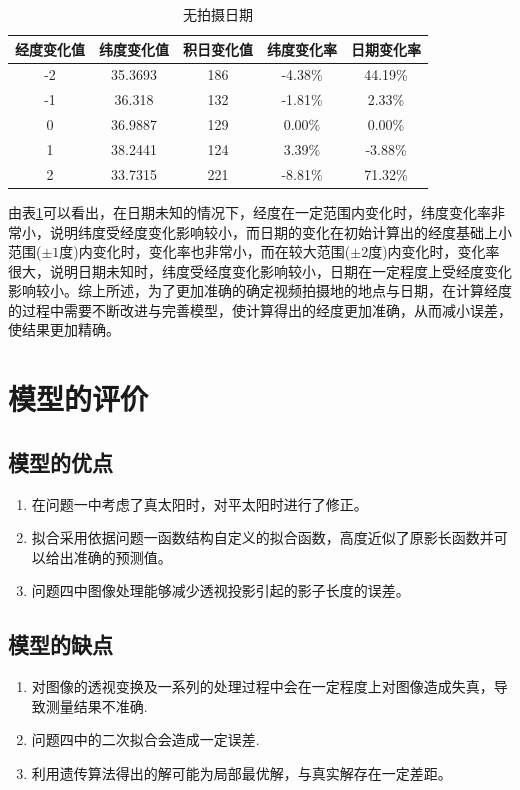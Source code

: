 \documentclass[12pt]{cumcmart}   %
\begin{document}
\begin{table}[H]
	\centering
	\caption{无拍摄日期}\label{answer3}
	\begin{tabular}{ccccc}
		\toprule[1.5pt]
经度变化值&	纬度变化值&	积日变化值&	纬度变化率&	日期变化率\\
		\midrule[1pt]

-2	&35.3693&	186&	-4.38\%	&44.19\% \\
-1&	36.318&	132	&-1.81\%&	2.33\%\\
0&	36.9887	&129&	0.00\%&	0.00\%  \\
1&	38.2441&	124	&3.39\%	&-3.88\%\\
2&	33.7315	&221&	-8.81\%	&71.32\% \\
		\bottomrule[1.5pt]
	\end{tabular}
\end{table}
由表\ref{answer3}可以看出，在日期未知的情况下，经度在一定范围内变化时，纬度变化率非常小，说明纬度受经度变化影响较小，而日期的变化在初始计算出的经度基础上小范围($\pm 1$度)内变化时，变化率也非常小，而在较大范围($\pm 2$度)内变化时，变化率很大，说明日期未知时，纬度受经度变化影响较小，日期在一定程度上受经度变化影响较小。综上所述，为了更加准确的确定视频拍摄地的地点与日期，在计算经度的过程中需要不断改进与完善模型，使计算得出的经度更加准确，从而减小误差，使结果更加精确。




\newpage

\section{模型的评价}
\subsection{模型的优点}
\begin{enumerate}
  \item  在问题一中考虑了真太阳时，对平太阳时进行了修正。
  \item 拟合采用依据问题一函数结构自定义的拟合函数，高度近似了原影长函数并可以给出准确的预测值。
  \item  问题四中图像处理能够减少透视投影引起的影子长度的误差。
\end{enumerate}

\subsection{模型的缺点}
\begin{enumerate}
  \item 对图像的透视变换及一系列的处理过程中会在一定程度上对图像造成失真，导致测量结果不准确.
  \item 问题四中的二次拟合会造成一定误差.
  \item 利用遗传算法得出的解可能为局部最优解，与真实解存在一定差距。
\end{enumerate}
\end{document}
